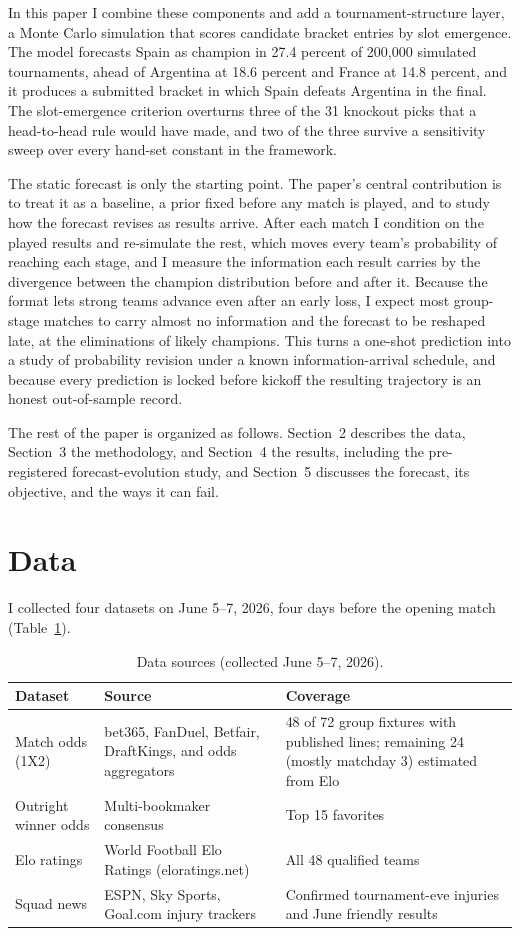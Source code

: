 \documentclass[11pt,letterpaper]{article}
\begin{document}
In this paper I combine these components and add a tournament-structure layer, a Monte Carlo simulation that scores candidate bracket entries by slot emergence. The model forecasts Spain as champion in 27.4 percent of 200{,}000 simulated tournaments, ahead of Argentina at 18.6 percent and France at 14.8 percent, and it produces a submitted bracket in which Spain defeats Argentina in the final. The slot-emergence criterion overturns three of the 31 knockout picks that a head-to-head rule would have made, and two of the three survive a sensitivity sweep over every hand-set constant in the framework.

The static forecast is only the starting point. The paper's central contribution is to treat it as a baseline, a prior fixed before any match is played, and to study how the forecast revises as results arrive. After each match I condition on the played results and re-simulate the rest, which moves every team's probability of reaching each stage, and I measure the information each result carries by the divergence between the champion distribution before and after it. Because the format lets strong teams advance even after an early loss, I expect most group-stage matches to carry almost no information and the forecast to be reshaped late, at the eliminations of likely champions. This turns a one-shot prediction into a study of probability revision under a known information-arrival schedule, and because every prediction is locked before kickoff the resulting trajectory is an honest out-of-sample record.

The rest of the paper is organized as follows. Section~2 describes the data, Section~3 the methodology, and Section~4 the results, including the pre-registered forecast-evolution study, and Section~5 discusses the forecast, its objective, and the ways it can fail.

\section{Data}

I collected four datasets on June 5--7, 2026, four days before the opening match (Table~\ref{tab:data}).

\begin{table}[ht]
\centering\small
\caption{Data sources (collected June 5--7, 2026).}
\label{tab:data}
\begin{tabular}{p{3.4cm}p{5.2cm}p{5.6cm}}
\toprule
Dataset & Source & Coverage \\
\midrule
Match odds (1X2) & bet365, FanDuel, Betfair, DraftKings, and odds aggregators & 48 of 72 group fixtures with published lines; remaining 24 (mostly matchday 3) estimated from Elo \\
Outright winner odds & Multi-bookmaker consensus & Top 15 favorites \\
Elo ratings & World Football Elo Ratings (eloratings.net) & All 48 qualified teams \\
Squad news & ESPN, Sky Sports, Goal.com injury trackers & Confirmed tournament-eve injuries and June friendly results \\
\bottomrule
\end{tabular}
\end{table}
\end{document}
